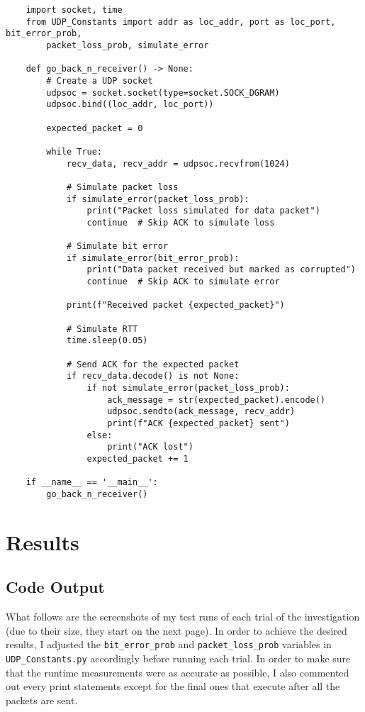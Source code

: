 \documentclass{article}
\begin{document}
\begin{verbatim}
    import socket, time
    from UDP_Constants import addr as loc_addr, port as loc_port, bit_error_prob,
        packet_loss_prob, simulate_error

    def go_back_n_receiver() -> None:
        # Create a UDP socket
        udpsoc = socket.socket(type=socket.SOCK_DGRAM)
        udpsoc.bind((loc_addr, loc_port))
    
        expected_packet = 0

        while True:
            recv_data, recv_addr = udpsoc.recvfrom(1024)
        
            # Simulate packet loss
            if simulate_error(packet_loss_prob):
                print("Packet loss simulated for data packet")
                continue  # Skip ACK to simulate loss
        
            # Simulate bit error
            if simulate_error(bit_error_prob):
                print("Data packet received but marked as corrupted")
                continue  # Skip ACK to simulate error
        
            print(f"Received packet {expected_packet}")

            # Simulate RTT
            time.sleep(0.05)

            # Send ACK for the expected packet
            if recv_data.decode() is not None:
                if not simulate_error(packet_loss_prob):
                    ack_message = str(expected_packet).encode()
                    udpsoc.sendto(ack_message, recv_addr)
                    print(f"ACK {expected_packet} sent")
                else:
                    print("ACK lost")
                expected_packet += 1

    if __name__ == '__main__':
        go_back_n_receiver()
\end{verbatim}

\section{Results}

\subsection{Code Output}

What follows are the screenshots of my test runs of each trial of the investigation (due to their size, they start on the next page). In order to achieve the desired results, I adjusted the \verb|bit_error_prob| and \verb|packet_loss_prob| variables in \verb|UDP_Constants.py| accordingly before running each trial. In order to make sure that the runtime measurements were as accurate as possible, I also commented out every print statements except for the final ones that execute after all the packets are sent.
\end{document}
